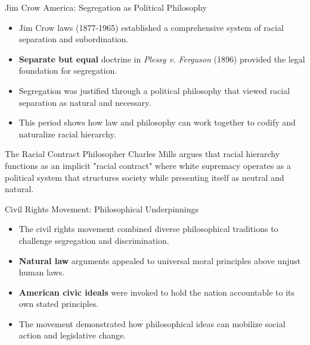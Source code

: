 \documentclass{beamer}
\begin{document}
	\begin{frame}{Jim Crow America: Segregation as Political Philosophy}
		\begin{itemize}
			\item Jim Crow laws (1877-1965) established a comprehensive system of racial separation and subordination.
			\item \textbf{Separate but equal} doctrine in \textit{Plessy v. Ferguson} (1896) provided the legal foundation for segregation.
			\item Segregation was justified through a political philosophy that viewed racial separation as natural and necessary.
			\item This period shows how law and philosophy can work together to codify and naturalize racial hierarchy.
		\end{itemize}
		
		\begin{exampleblock}{The Racial Contract}
			Philosopher Charles Mills argues that racial hierarchy functions as an implicit "racial contract" where white supremacy operates as a political system that structures society while presenting itself as neutral and natural.
		\end{exampleblock}
	\end{frame}
	
	\begin{frame}{Civil Rights Movement: Philosophical Underpinnings}
		\begin{itemize}
			\item The civil rights movement combined diverse philosophical traditions to challenge segregation and discrimination.
			\item \textbf{Natural law} arguments appealed to universal moral principles above unjust human laws.
			\item \textbf{American civic ideals} were invoked to hold the nation accountable to its own stated principles.
			\item The movement demonstrated how philosophical ideas can mobilize social action and legislative change.
		\end{itemize}
		
	\end{frame}
	
\end{document}
